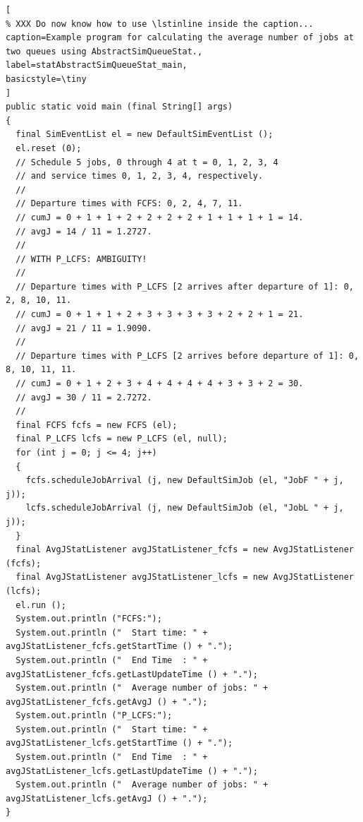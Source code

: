 \documentclass[12pt]{book}
\begin{document}
\begin{lstlisting}[
% XXX Do now know how to use \lstinline inside the caption...
caption=Example program for calculating the average number of jobs at two queues using AbstractSimQueueStat.,
label=statAbstractSimQueueStat_main,
basicstyle=\tiny
]
public static void main (final String[] args)
{
  final SimEventList el = new DefaultSimEventList ();
  el.reset (0);
  // Schedule 5 jobs, 0 through 4 at t = 0, 1, 2, 3, 4
  // and service times 0, 1, 2, 3, 4, respectively.
  //
  // Departure times with FCFS: 0, 2, 4, 7, 11.
  // cumJ = 0 + 1 + 1 + 2 + 2 + 2 + 2 + 1 + 1 + 1 + 1 = 14.
  // avgJ = 14 / 11 = 1.2727.
  //
  // WITH P_LCFS: AMBIGUITY!
  //
  // Departure times with P_LCFS [2 arrives after departure of 1]: 0, 2, 8, 10, 11.
  // cumJ = 0 + 1 + 1 + 2 + 3 + 3 + 3 + 3 + 2 + 2 + 1 = 21.
  // avgJ = 21 / 11 = 1.9090.
  //
  // Departure times with P_LCFS [2 arrives before departure of 1]: 0, 8, 10, 11, 11.
  // cumJ = 0 + 1 + 2 + 3 + 4 + 4 + 4 + 4 + 3 + 3 + 2 = 30.
  // avgJ = 30 / 11 = 2.7272.    
  //
  final FCFS fcfs = new FCFS (el);
  final P_LCFS lcfs = new P_LCFS (el, null);
  for (int j = 0; j <= 4; j++)
  {
    fcfs.scheduleJobArrival (j, new DefaultSimJob (el, "JobF " + j, j));
    lcfs.scheduleJobArrival (j, new DefaultSimJob (el, "JobL " + j, j));
  }
  final AvgJStatListener avgJStatListener_fcfs = new AvgJStatListener (fcfs);
  final AvgJStatListener avgJStatListener_lcfs = new AvgJStatListener (lcfs);
  el.run ();
  System.out.println ("FCFS:");
  System.out.println ("  Start time: " + avgJStatListener_fcfs.getStartTime () + ".");
  System.out.println ("  End Time  : " + avgJStatListener_fcfs.getLastUpdateTime () + ".");
  System.out.println ("  Average number of jobs: " + avgJStatListener_fcfs.getAvgJ () + ".");
  System.out.println ("P_LCFS:");
  System.out.println ("  Start time: " + avgJStatListener_lcfs.getStartTime () + ".");
  System.out.println ("  End Time  : " + avgJStatListener_lcfs.getLastUpdateTime () + ".");
  System.out.println ("  Average number of jobs: " + avgJStatListener_lcfs.getAvgJ () + ".");
}
\end{lstlisting}
\end{document}
